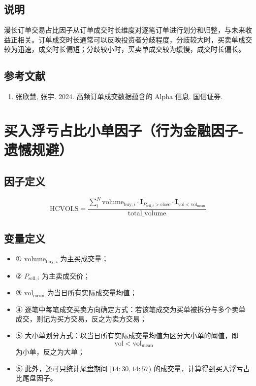 \documentclass{article}
\begin{document}
\subsection{说明}
漫长订单交易占比因子从订单成交时长维度对逐笔订单进行划分和归整，与未来收益正相关。订单成交时长通常可以反映投资者分歧程度，分歧较大时，买卖单成交较为迅速，成交时长偏短；分歧较小时，买卖单成交较为缓慢，成交时长偏长。

\subsection{参考文献}
\begin{enumerate}
    \item 张欣慧, 张宇. 2024. 高频订单成交数据蕴含的 Alpha 信息. 国信证券.
\end{enumerate}

\section{买入浮亏占比小单因子（行为金融因子-遗憾规避）}

\subsection{因子定义}
\begin{equation}
    \mathrm{HCVOLS} = \frac{\sum_{i}^{N} \mathrm{volume}_{\mathrm{buy},i} \cdot \mathbf{I}_{P_{\mathrm{sell},i} > \mathrm{close}} \cdot \mathbf{I}_{\mathrm{vol} < \mathrm{vol}_{\mathrm{mean}}}}{\mathrm{total\_volume}}
\end{equation}

\subsection{变量定义}
\begin{itemize}
    \item ① \( \mathrm{volume}_{\mathrm{buy},i} \) 为主买成交量；
    \item ② \( P_{\mathrm{sell},i} \) 为主卖成交价；
    \item ③ \( \mathrm{vol}_{\mathrm{mean}} \) 为当日所有实际成交量均值；
    \item ④ 逐笔中每笔成交买卖方向确定方式：若该笔成交为买单被拆分与多个卖单成交，则记为买方交易，反之为卖方交易；
    \item ⑤ 大小单划分方式：以当日所有实际成交量均值为区分大小单的阈值，即
        \begin{equation*}
            \mathrm{vol} < \mathrm{vol}_{\mathrm{mean}}
        \end{equation*}
        为小单，反之为大单；
    \item ⑥ 此外，还可只统计尾盘期间 \([14:30,14:57)\) 的成交量，计算得到买入浮亏占比尾盘因子。
\end{itemize}
\end{document}
